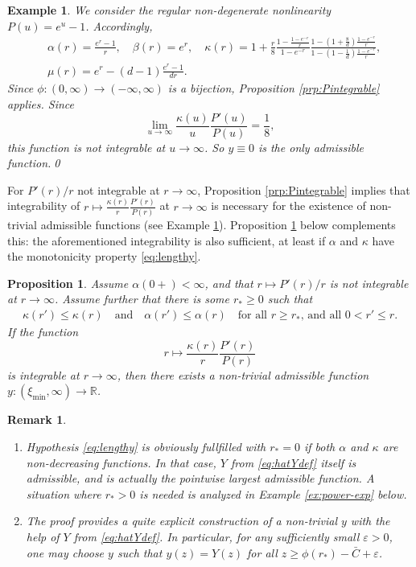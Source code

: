 \documentclass[reqno]{amsart}
\newtheorem{remark}[lemma]{Remark}
\newtheorem{prop}[lemma]{Proposition}
\newtheorem{example}[lemma]{Example}
\newcommand{\R}{\mathbb{R}}
\newcommand{\eps}{{\varepsilon}}
\begin{document}
%
\begin{example}\label{xmp:exponential}
  We consider the regular non-degenerate nonlinearity $P(u)=e^u-1$. 
  Accordingly, 
  \begin{align*}
    &\alpha(r) = \frac{e^r-1}r,\quad\beta(r)=e^r,\quad 
    \kappa(r) = 1 + \frac r8 \frac{1-\frac{1-e^{-r}}r}{1-e^{-r}}
    \frac{1-\left(1+\frac8d\right)\frac{1-e^{-r}}r}{1-\left(1-\frac1d\right)\frac{1-e^{-r}}r},\\
    &\mu(r)=e^r-(d-1)\frac{e^r-1}{dr}.
  \end{align*}  
  Since $\phi:(0,\infty)\to(-\infty,\infty)$ is a bijection, Proposition \ref{prp:Pintegrable} applies.
  Since
  $$
    \lim_{u\to\infty} \frac{\kappa(u)}{u}\frac{P'(u)}{P(u)}=\frac18,
  $$
  this function is not integrable at $u\to\infty$.
  So $y\equiv0$ is the only admissible function.\qed
\end{example}
%
For $P'(r)/r$ not integrable at $r\to\infty$, 
Proposition \ref{prp:Pintegrable} implies that integrability of $r\mapsto \frac{\kappa(r)}{r}\frac{P'(r)}{P(r)}$ at $r\to\infty$ is necessary for the existence of non-trivial admissible functions (see Example \ref{xmp:exponential}). Proposition \ref{prp:nontrivialy} below complements this: the aforementioned integrability is also sufficient, at least if $\alpha$ and $\kappa$ have the monotonicity property \eqref{eq:lengthy}.
%
\begin{prop}\label{prp:nontrivialy}
    Assume $\alpha(0+)<\infty$, and that $r\mapsto P'(r)/r$ is not integrable at $r\to\infty$. Assume further that there is some $r_*\ge0$ such that
    \begin{align}\label{eq:lengthy}
        \kappa(r')\le\kappa(r)
        \quad\text{and}\quad
        \alpha(r')\le\alpha(r)
        \quad\text{for all $r\ge r_*$, and all $0<r'\le r$.}
    \end{align}
    If the function
    \begin{equation}\label{r-map}
        r\mapsto\frac{\kappa(r)}{r}\frac{P'(r)}{P(r)}
    \end{equation} 
    is integrable at $r\to\infty$, then there exists a non-trivial admissible function $y:(\xi_{\min},\infty)\to\R$.
\end{prop}
%
\begin{remark}\label{rem:Y-max-entropy}\
    \begin{enumerate}
    \item[(a)] Hypothesis \eqref{eq:lengthy} is obviously fullfilled with $r_*=0$ if both $\alpha$ and $\kappa$ are non-decreasing functions. In that case, $Y$ from \eqref{eq:hatYdef} itself is admissible, and is actually the pointwise largest admissible function. A situation where $r_*>0$ is needed is analyzed in Example \ref{ex:power-exp} below.
    \item[(b)] The proof provides a quite explicit construction of a non-trivial $y$ with the help of $Y$ from \eqref{eq:hatYdef}. In particular, for any sufficiently small $\eps>0$, one may choose $y$ such that $y(z)=Y(z)$ for all $z\ge \phi(r_*)-\bar C+\eps$.
    \end{enumerate}
\end{remark}
\end{document}
